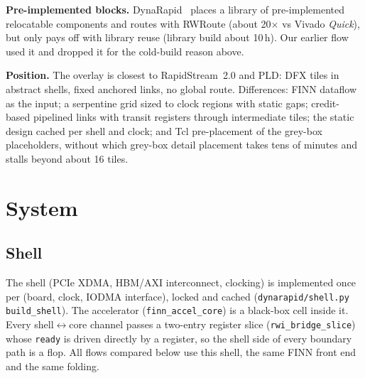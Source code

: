 \documentclass[10pt,twocolumn]{article}
\newcommand{\code}[1]{\texttt{\small #1}}
\begin{document}
\textbf{Pre-implemented blocks.} DynaRapid~\cite{dynarapid} places a library of pre-implemented
relocatable components and routes with RWRoute (about 20$\times$ vs Vivado \emph{Quick}), but
only pays off with library reuse (library build about 10\,h). Our earlier flow used it and
dropped it for the cold-build reason above.

\textbf{Position.} The overlay is closest to RapidStream~2.0 and PLD: DFX tiles in abstract
shells, fixed anchored links, no global route. Differences: FINN dataflow as the input; a
serpentine grid sized to clock regions with static gaps; credit-based pipelined links with
transit registers through intermediate tiles; the static design cached per shell and clock; and
Tcl pre-placement of the grey-box placeholders, without which grey-box detail placement takes
tens of minutes and stalls beyond about 16 tiles.

\section{System}
\subsection{Shell}
The shell (PCIe XDMA, HBM/AXI interconnect, clocking) is implemented once per (board, clock,
IODMA interface), locked and cached (\code{dynarapid/shell.py build\_shell}). The accelerator
(\code{finn\_accel\_core}) is a black-box cell inside it. Every shell$\leftrightarrow$core
channel passes a two-entry register slice (\code{rwi\_bridge\_slice}) whose \code{ready} is driven
directly by a register, so the shell side of every boundary path is a flop. All flows compared
below use this shell, the same FINN front end and the same folding.
\end{document}
